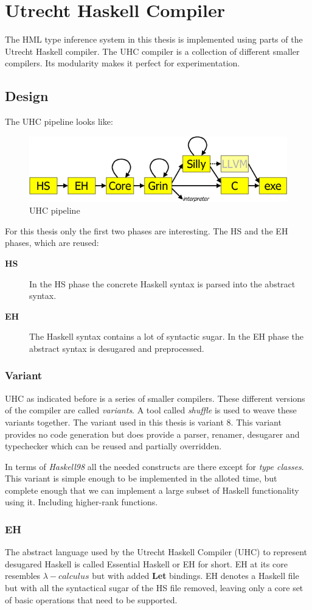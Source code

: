 \chapter{Utrecht Haskell Compiler}
The HML type inference system in this thesis is implemented using parts of the Utrecht Haskell compiler. The UHC compiler is a collection of different smaller  compilers. Its modularity makes it perfect for experimentation.
\section{Design}
The UHC pipeline looks like:
\begin{figure}[H]
\includegraphics[scale=0.8]{ehc-dataflow2}
\caption{UHC pipeline}
\label{flow}
\end{figure}

For this thesis only the first two phases are interesting. The HS and the EH phases, which are reused:
\begin{description}
\item[\textbf{HS}] In the HS phase the concrete Haskell syntax is parsed into the abstract syntax. 
\item[\textbf{EH}] The Haskell syntax contains a lot of syntactic sugar. In the EH phase the abstract syntax is desugared and preprocessed.
\end{description}
\subsection{Variant}
UHC as indicated before is a series of smaller compilers. These different versions of the compiler are called \emph{variants}. A tool called \emph{shuffle} is used to weave these variants together. The variant used in this thesis is variant 8. This variant provides no code generation but does provide a parser, renamer, desugarer and typechecker which can be reused and partially overridden.

In terms of \emph{Haskell98} all the needed constructs are there except for \emph{type classes}. This variant is simple enough to be implemented in the alloted time, but complete enough that we can implement a large subset of Haskell functionality using it. Including higher-rank functions.

\subsection{EH}
The abstract language used by the Utrecht Haskell Compiler (UHC) to represent desugared Haskell is called Essential Haskell or EH for short. EH at its core resembles $\lambda-calculus$ but with added \textbf{Let} bindings. EH denotes a Haskell file but with all the syntactical sugar of the HS file removed, leaving only a core set of basic operations that need to be supported.
